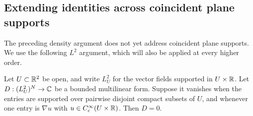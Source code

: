 \subsection{Extending identities across coincident plane supports}
\label{subsec:rotation-contact}

The preceding density argument does not yet address coincident
plane supports. We use the following $L^2$ argument,
which will also be applied at every higher order.

\begin{proposition}\label{prop:rotation-no-contact}
Let $U\subset\mathbb R^2$ be open, and write $L^2_U$ for the vector
fields supported in $U\times\mathbb R$. Let $D:(L^2_U)^N\to\mathbb C$ be a
bounded multilinear form. Suppose it vanishes when the entries
are supported over pairwise disjoint compact subsets of $U$,
and whenever one entry is $\nabla u$ with
$u\in C_c^\infty(U\times\mathbb R)$. Then $D=0$.
\end{proposition}

